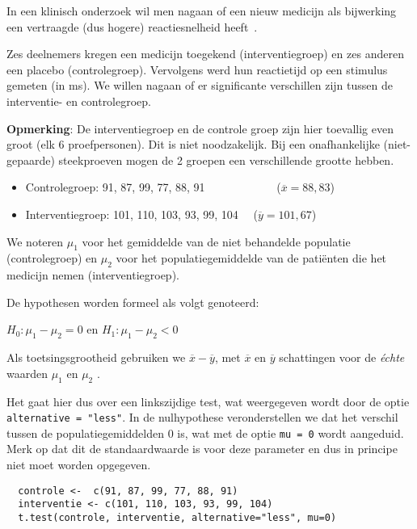 \begin{example}
  In een klinisch onderzoek wil men nagaan of een nieuw medicijn als bijwerking een vertraagde (dus hogere) reactiesnelheid heeft~\autocite{Lindquist}.
  
  Zes deelnemers kregen een medicijn toegekend (interventiegroep) en zes anderen een placebo (controlegroep). Vervolgens werd hun reactietijd op een stimulus gemeten (in ms). We willen nagaan of er significante verschillen zijn tussen de interventie- en controlegroep.
  
  \textbf{Opmerking}: De interventiegroep en de controle groep zijn hier toevallig even groot (elk 6 proefpersonen).
  Dit is niet noodzakelijk. Bij een onafhankelijke (niet-gepaarde) steekproeven
  mogen de 2 groepen een verschillende grootte hebben.
  
  \begin{itemize}
    \item Controlegroep: 91, 87, 99, 77, 88, 91 ~~~~~~~~~~~~($\overline{x}=88,83$)
    \item Interventiegroep: 101, 110, 103, 93, 99, 104 ~~($\overline{y}=101,67$)
  \end{itemize}
  
  We noteren $\mu_1$ voor het gemiddelde van de niet behandelde populatie (controlegroep) en $\mu_2$ voor het populatiegemiddelde van de patiënten die het medicijn nemen (interventiegroep).
  
  De hypothesen worden formeel als volgt genoteerd:
  
  $H_0: \mu_1 - \mu_2 = 0$ en $H_1: \mu_1 - \mu_2 < 0$
  
  Als toetsingsgrootheid gebruiken we $\overline{x}-\overline{y}$, met $\overline{x}$ en $\overline{y}$ schattingen voor de \textit{\'echte} waarden $\mu_1$ en $\mu_2$ .
  
  Het gaat hier dus over een linkszijdige test, wat weergegeven wordt door de optie \texttt{alternative = "less"}. In de nulhypothese veronderstellen we dat het verschil tussen de populatiegemiddelden 0 is, wat met de optie \texttt{mu = 0} wordt aangeduid. Merk op dat dit de standaardwaarde is voor deze parameter en dus in principe niet moet worden opgegeven.
  
  \begin{lstlisting}
  controle <-  c(91, 87, 99, 77, 88, 91)
  interventie <- c(101, 110, 103, 93, 99, 104)
  t.test(controle, interventie, alternative="less", mu=0)
  \end{lstlisting}
  

\end{example}
